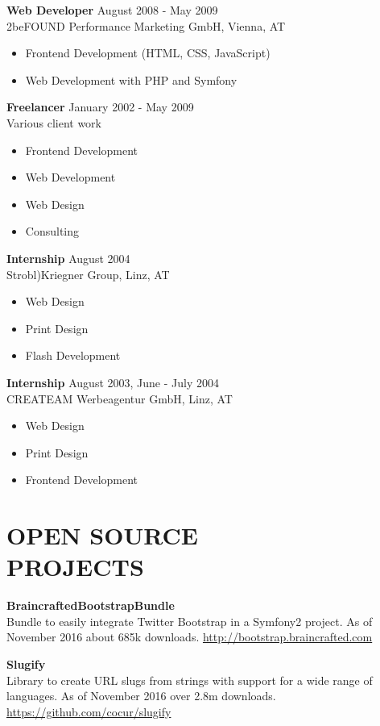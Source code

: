 \documentclass[margin]{res}
\begin{document}
\begin{resume}
\textbf{Web Developer} \hfill August 2008 - May 2009 \\
	2beFOUND Performance Marketing GmbH, Vienna, AT
	\begin{itemize}  \itemsep -2pt
		\item Frontend Development (HTML, CSS, JavaScript)
		\item Web Development with PHP and Symfony
	\end{itemize}

\textbf{Freelancer} \hfill January 2002 - May 2009 \\
	Various client work
	\begin{itemize}  \itemsep -2pt
		\item Frontend Development
		\item Web Development
		\item Web Design
		\item Consulting
	\end{itemize}

\textbf{Internship} \hfill August 2004 \\
	Strobl)Kriegner Group, Linz, AT
	\begin{itemize}  \itemsep -2pt
		\item Web Design
		\item Print Design
		\item Flash Development
	\end{itemize}

\textbf{Internship} \hfill August 2003, June - July 2004 \\
	CREATEAM Werbeagentur GmbH, Linz, AT
	\begin{itemize}  \itemsep -2pt
		\item Web Design
		\item Print Design
		\item Frontend Development
	\end{itemize}

\clearpage

\section{OPEN SOURCE \\ PROJECTS}

\textbf{BraincraftedBootstrapBundle} \\
	Bundle to easily integrate Twitter Bootstrap in a Symfony2 project. As of November 2016 about 685k downloads. \url{http://bootstrap.braincrafted.com}

\textbf{Slugify} \\
	Library to create URL slugs from strings with support for a wide range of languages. As of November 2016 over 2.8m downloads. \url{https://github.com/cocur/slugify}


\end{resume}
\end{document}
